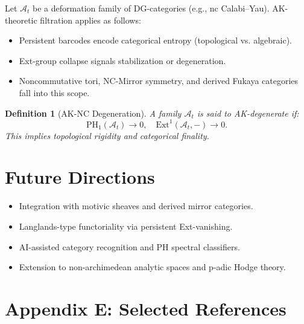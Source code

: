 \documentclass[11pt]{article}
\newtheorem{definition}[theorem]{Definition}
\begin{document}
Let \( \mathcal{A}_t \) be a deformation family of DG-categories (e.g., nc Calabi–Yau).  
AK-theoretic filtration applies as follows:

\begin{itemize}
    \item Persistent barcodes encode categorical entropy (topological vs. algebraic).
    \item Ext-group collapse signals stabilization or degeneration.
    \item Noncommutative tori, NC-Mirror symmetry, and derived Fukaya categories fall into this scope.
\end{itemize}

\begin{definition}[AK-NC Degeneration]
A family \( \mathcal{A}_t \) is said to AK-degenerate if:
\[
\mathrm{PH}_1(\mathcal{A}_t) \to 0, \quad \mathrm{Ext}^1(\mathcal{A}_t, -) \to 0.
\]
This implies topological rigidity and categorical finality.
\end{definition}


\section{Future Directions}

\begin{itemize}
    \item Integration with motivic sheaves and derived mirror categories.
    \item Langlands-type functoriality via persistent Ext-vanishing.
    \item AI-assisted category recognition and PH spectral classifiers.
    \item Extension to non-archimedean analytic spaces and p-adic Hodge theory.
\end{itemize}



\section*{Appendix E: Selected References}
\end{document}
